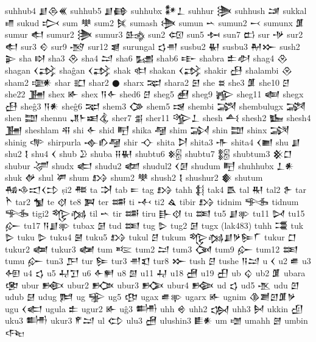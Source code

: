  suhhub4  𒋗𒁲𒌍    
 suhhub5  𒋗𒂵    
 suhhubx  𒀯𒁇    
 suhhur  𒋦   
 suhhush  𒁼   
 sukkal  𒈛   
 sukud  𒃴   
 sum  𒋧   
 sum2  𒍮   
 sumash  𒋨
 sumun   𒌀
 sumun2  𒁁
 sumunx  𒂠   
 sumur  𒊨   
 sumur2  𒋦   
 sumur3  𒈰   
 sun2  𒄢   
 sun5  𒁔   
 sun7  𒆗   
 sur  𒋩   
 sur2  𒊨   
 sur3  𒄮   
 sur9  𒋪   
 sur12  𒇭   
 surungal  𒌓𒉣    
 susbu2  𒈽   
 susbu3  𒈹𒁍    
 sush2  𒉌   
 sha  𒊭   
 sha3  𒊮   
 sha4  𒁺   
 sha6  𒊷   
 shab6  𒊸   
 shabra  𒉺𒀠    
 shag4  𒊮   
 shagan  𒌋𒃶    
 shaĝan  𒌋𒃶    
 shak  𒊕   
 shakan  𒌋𒃶    
 shakir  𒍀   
 shalambi  𒊮   
 sham2  𒉛   
 shar  𒊬   
 shar2  𒊹   
 sharx  𒉈   
 shara2  𒇋   
 she  𒊺   
 she3  𒂠   
 she10  𒆪   
 she22  𒂞   
 shex  𒅊   
 shex  𒀀𒅆    
 shed6  𒆪   
 sheg5  𒍋   
 sheg9  𒊾   
 sheg11  𒅝   
 shegx  𒍀   
 sheĝ3  𒀀𒀭    
 sheĝ6  𒉈   
 shem3  𒀚   
 shem5  𒀎   
 shembi  𒋍   
 shembulugx  𒋎   
 shen  𒊿   
 shennu  𒂗𒈨𒀜𒆬    
 sher7  𒉪   
 sher11  𒄊𒁇    
 shesh  𒋀   
 shesh2  𒋁   
 shesh4  𒂞   
 sheshlam  𒋂   
 shi  𒅆   
 shid  𒋃   
 shika  𒆷   
 shim  𒋆   
 shin  𒊿   
 shinx  𒋋   
 shinig  𒋒   
 shirpurla   𒉢𒁓𒆷   
 shir  𒋓   
 shita  𒋖   
 shita3  𒋥   
 shita4  𒌋𒆤    
 shu  𒋗   
 shu2  𒋙   
 shu4  𒌋   
 shub  𒊒   
 shuba  𒍝𒈽    
 shubtu6  𒆝   
 shubtu7  𒆞   
 shubtum3  𒆜𒆸    
 shubur  𒋚   
 shudx  𒅗   
 shudu2  𒆃   
 shudul2  𒌋𒌆    
 shudum  𒋃   
 shuhhubx  𒁇𒀭    
 shuk  𒉻   
 shul  𒂄   
 shum  𒋳   
 shum2  𒋧   
 shush2  𒋙   
 shushur2  𒀽   
 shutum  𒄀𒈾𒀊𒌋𒄞    
 ṣi2  𒍣   
 ta  𒋫   
 tab  𒋰   
 tag  𒋳   
 tahh  𒈭   
 tak4  𒋺   
 tal  𒊑   
 tal2  𒉿   
 tar  𒋻   
 tar2  𒁯   
 te  𒋼   
 te8  𒀉   
 ter  𒌁   
 ti  𒋾   
 ti2  𒎗   
 tibir  𒋳   
 tidnim  𒊎   
 tidnum  𒊎   
 tigi2  𒈜𒁆    
 til  𒌀   
 tir  𒌁   
 tiru  𒃲𒋼    
 tu  𒌅   
 tu5  𒋗𒉀    
 tu11  𒄸   
 tu15  𒅎   
 tu17  𒀀𒋗𒉀    
 tubax  𒌆   
 tud  𒌅   
 tug  𒌇   
 tug2  𒌆   
 tugx  (lak483)   
 tuhh  𒂃   
 tuk  𒌇   
 tuku  𒌇   
 tuku4  𒇧   
 tuku5  𒋳   
 tukul  𒆪   
 tukum  𒈜𒁆𒋗𒃻𒌉𒇲    
 tukur  𒆸   
 tukur2  𒆁   
 tukur3  𒆈   
 tum  𒌈   
 tum2  𒁺   
 tum3  𒉐   
 tum9  𒅎   
 tum12  𒌅   
 tumu  𒅎   
 tun3  𒂅   
 tur  𒌉   
 tur3  𒉣𒇬    
 tur8  𒁍   
 tush  𒆪   
 tushe  𒀀𒁺    
 u  𒌋   
 u2  𒌑   
 u3  𒅇   
 u4  𒌓   
 u5  𒄷𒋛    
 u6  𒅆𒂍    
 u8  𒇇   
 u11  𒄷   
 u18  𒍇   
 u19  𒌷   
 ub  𒌒   
 ub2  𒂠   
 ubara  𒂬   
 ubur  𒁛   
 ubur2  𒁥   
 ubur3  𒁡   
 ubur4  𒁢   
 ud  𒌓   
 ud5  𒍚   
 udu  𒇻   
 udub  𒇛   
 udug  𒌜   
 ug  𒊌   
 ug5  𒂦   
 ugax  𒌑𒉀    
 ugarx  𒅊   
 ugnim  𒆠𒋢𒇻𒂠𒃻    
 ugu  𒌋𒅗    
 ugula  𒉺   
 ugur2  𒅊   
 uĝ3  𒌦   
 uhh  𒄴   
 uhh2  𒌔   
 uhh3  𒆵   
 ukkin  𒌺   
 uku3  𒌦   
 ukur3  𒇳𒁺    
 ul  𒌌   
 ulu3  𒍇   
 ulushin3  𒀾𒀭    
 um  𒌝   
 umahh  𒇦   
 umbin  𒌢   
